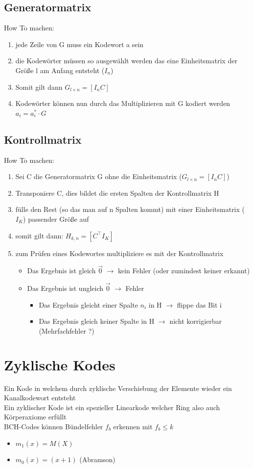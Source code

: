 \documentclass[12pt,a4paper]{article}
\begin{document}
\subsection{Generatormatrix}
How To machen:
\begin{enumerate}
\item jede Zeile von G muss ein Kodewort a sein
\item die Kodewörter müssen so ausgewählt werden das eine Einheitsmatrix der Größe l am Anfang entsteht ($I_n$)
\item Somit gilt dann $G_{l\times n} = [I_n C]$
\item Kodewörter können nun durch das Multiplizieren mit G kodiert werden\\
$a_i = a_i^* \cdot G$
\end{enumerate}

\subsection{Kontrollmatrix}
How To machen:
\begin{enumerate}
\item Sei C die Generatormatrix G ohne die Einheitsmatrix ($G_{l\times n} = [I_n C]$)
\item Transponiere C, dies bildet die ersten Spalten der Kontrollmatrix H
\item fülle den Rest (so das man auf n Spalten kommt) mit einer Einheitsmatrix ($I_K$) passender Größe auf
\item somit gilt dann: $H_{k, n} = [C^\top I_K]$
\item zum Prüfen eines Kodewortes multipliziere es mit der Kontrollmatrix\\
\begin{itemize}
\item Das Ergebnis ist gleich $\vec{0}$ $\rightarrow$ kein Fehler (oder zumindest keiner erkannt)
\item Das Ergebnis ist ungleich $\vec{0}$ $\rightarrow$ Fehler
\begin{itemize}
\item Das Ergebnis gleicht einer Spalte $n_i$ in H $\rightarrow$ flippe das Bit i
\item Das Ergebnis gleich keiner Spalte in H $\rightarrow$ nicht korrigierbar (Mehrfachfehler ?)
\end{itemize}
\end{itemize}
\end{enumerate}

\section{Zyklische Kodes}
Ein Kode in welchem durch zyklische Verschiebung der Elemente wieder ein Kanalkodewort entsteht\\
Ein zyklischer Kode ist ein spezieller Linearkode welcher Ring also auch Körperaxiome erfüllt\\
BCH-Codes können Bündelfehler $f_b$ erkennen mit $f_b \leq k$
\begin{itemize}
\item $m_1(x) = M(X)$
\item $m_0(x) = (x+1)$ (Abramson)
\end{itemize}
\end{document}
